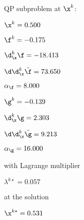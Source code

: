 QP subproblem at $\x^{k}$:

\bigskip
$\x^k=   0.500$


$\f^k =  -0.175$

$\d^k_{\x} \f = -18.413$

$\d\d^k_{\x} \tilde \f =  73.650$

$\alpha_{\footnotesize\f} =   8.000$

\bigskip
$\g^k =  -0.139$

$\d^k_{\x}\g =   2.303$

$\d\d^k_{\x} \tilde \g =   9.213$

$\alpha_{\footnotesize\g} =  16.000$

\bigskip
with Lagrange multiplier

$\lambda^{k\star} =   0.057$

at the solution

$\x^{k\star} =   0.531$

